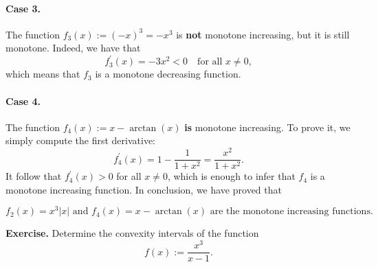 \documentclass[a4paper,10 pt]{report}
\newcommand{\finalanswer}[1]{%
    \begin{finalAnswer}
    \[
        #1
    \]
    \end{finalAnswer}
}
\theoremstyle{definition}
\begin{document}
\begin{solutionBox}
\paragraph{Case 3.} The function $f_3(x) := (-x)^3 = - x^3$ is \textbf{not} monotone increasing, but it is still monotone. Indeed, we have that
 \begin{equation*} f_3^\prime(x) = - 3x^2 < 0 \quad \text{for all $x \neq 0$}, \end{equation*}
 which means that $f_3$ is a monotone decreasing function.
 
\paragraph{Case 4.} The function $f_4(x) := x - \arctan(x)$ \textbf{is} monotone increasing. To prove it, we simply compute the first derivative:
\begin{equation*} f_4^\prime(x) = 1 - \frac{1}{1 + x^2} = \frac{x^2}{1 + x^2}. \end{equation*}
It follow that $f_4^\prime(x) > 0$ for all $x \neq 0$, which is enough to infer that $f_4$ is a monotone increasing function. In conclusion, we have proved that
\finalanswer{
  \text{$f_2(x) = x^3 |x|$ and $f_4(x) = x - \arctan(x)$ are the monotone increasing functions.}
} \end{solutionBox}

\begin{exerciseBox} \textbf{Exercise.} Determine the convexity intervals of the function
\begin{equation*}f(x) := \frac{x^3}{x - 1}. \end{equation*}
\end{exerciseBox}
\end{document}
